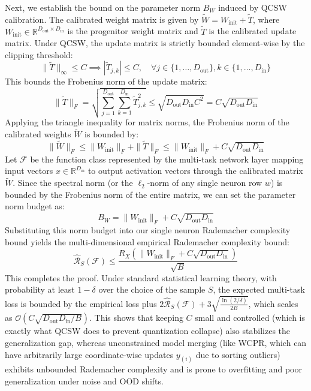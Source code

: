 \documentclass{article}
\theoremstyle{plain}
\theoremstyle{definition}
\theoremstyle{remark}
\begin{document}
Next, we establish the bound on the parameter norm $B_W$ induced by QCSW calibration. The calibrated weight matrix is given by $\tilde{W} = W_{\text{init}} + \tilde{T}$, where $W_{\text{init}} \in \mathbb{R}^{D_{\text{out}} \times D_{\text{in}}}$ is the progenitor weight matrix and $\tilde{T}$ is the calibrated update matrix. Under QCSW, the update matrix is strictly bounded element-wise by the clipping threshold:
\begin{equation}
\|\tilde{T}\|_\infty \le C \implies |\tilde{T}_{j, k}| \le C, \quad \forall j \in \{1, \dots, D_{\text{out}}\}, k \in \{1, \dots, D_{\text{in}}\}
\end{equation}
This bounds the Frobenius norm of the update matrix:
\begin{equation}
\|\tilde{T}\|_F = \sqrt{\sum_{j=1}^{D_{\text{out}}} \sum_{k=1}^{D_{\text{in}}} \tilde{T}_{j, k}^2} \le \sqrt{D_{\text{out}} D_{\text{in}} C^2} = C \sqrt{D_{\text{out}} D_{\text{in}}}
\end{equation}
Applying the triangle inequality for matrix norms, the Frobenius norm of the calibrated weights $\tilde{W}$ is bounded by:
\begin{equation}
\|\tilde{W}\|_F \le \|W_{\text{init}}\|_F + \|\tilde{T}\|_F \le \|W_{\text{init}}\|_F + C \sqrt{D_{\text{out}} D_{\text{in}}}
\end{equation}
Let $\mathcal{F}$ be the function class represented by the multi-task network layer mapping input vectors $x \in \mathbb{R}^{D_{\text{in}}}$ to output activation vectors through the calibrated matrix $\tilde{W}$. Since the spectral norm (or the $\ell_2$-norm of any single neuron row $w$) is bounded by the Frobenius norm of the entire matrix, we can set the parameter norm budget as:
\begin{equation}
B_W = \|W_{\text{init}}\|_F + C \sqrt{D_{\text{out}} D_{\text{in}}}
\end{equation}
Substituting this norm budget into our single neuron Rademacher complexity bound yields the multi-dimensional empirical Rademacher complexity bound:
\begin{equation}
\widehat{\mathcal{R}}_S(\mathcal{F}) \le \frac{R_X \left( \|W_{\text{init}}\|_F + C \sqrt{D_{\text{out}} D_{\text{in}}} \right)}{\sqrt{B}}
\end{equation}
This completes the proof. Under standard statistical learning theory, with probability at least $1 - \delta$ over the choice of the sample $S$, the expected multi-task loss is bounded by the empirical loss plus $2 \widehat{\mathcal{R}}_S(\mathcal{F}) + 3 \sqrt{\frac{\ln(2/\delta)}{2B}}$, which scales as $\mathcal{O}\left( C \sqrt{D_{\text{out}} D_{\text{in}} / B} \right)$.
This shows that keeping $C$ small and controlled (which is exactly what QCSW does to prevent quantization collapse) also stabilizes the generalization gap, whereas unconstrained model merging (like WCPR, which can have arbitrarily large coordinate-wise updates $y_{(i)}$ due to sorting outliers) exhibits unbounded Rademacher complexity and is prone to overfitting and poor generalization under noise and OOD shifts.
\end{document}
